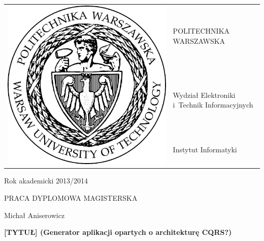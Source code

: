 \begin{titlepage}

 \begin{tabular}{ll}
  \multirow{3}{*}{\includegraphics[scale=0.3]{figures/pw.jpg}} & POLITECHNIKA WARSZAWSKA                      \\
                                                               & Wydział Elektroniki i~Technik Informacyjnych \\
                                                               & Instytut Informatyki
 \end{tabular}
 
 \begin{flushright}
  Rok akademicki 2013/2014
 \end{flushright}

 \vspace{2cm}
 
 \begin{center}
  \LARGE PRACA DYPLOMOWA MAGISTERSKA
  
  \vspace{2cm}
  
  \large Michał Aniserowicz
  
  \vspace{2cm}
  
  \textbf{[TYTUŁ] (Generator aplikacji opartych o architekturę CQRS?)}
 \end{center}
 

\end{titlepage}
